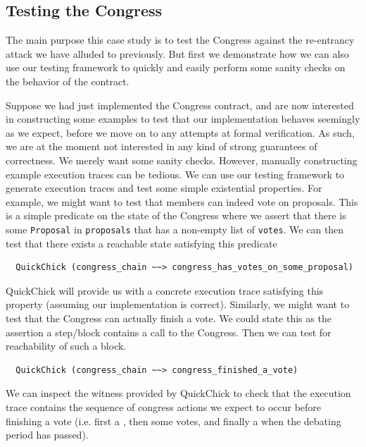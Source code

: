\documentclass[twoside,11pt,openright]{report}
\newenvironment{code}{\captionsetup{type=figure, singlelinecheck=off, justification=raggedleft}}{}
\newcommand{\coq}[1]{\texttt{#1}}
\begin{document}
\subsection{Testing the Congress}
The main purpose this case study is to test the Congress against the re-entrancy attack we have alluded to previously. But first we demonstrate how we can also use our testing framework to quickly and easily perform some sanity checks on the behavior of the contract.

Suppose we had just implemented the Congress contract, and are now interested in constructing some examples to test that our implementation behaves seemingly as we expect, before we move on to any attempts at formal verification. As such, we are at the moment not interested in any kind of strong guarantees of correctness. We merely want some sanity checks. However, manually constructing example execution traces can be tedious. We can use our testing framework to generate execution traces and test some simple existential properties. For example, we might want to test that members can indeed vote on proposals. This is a simple predicate on the state of the Congress where we assert that there is some \coq{Proposal} in \coq{proposals} that has a non-empty list of \coq{votes}. We can then test that there exists a reachable state satisfying this predicate
\begin{code}
\begin{verbatim}
  QuickChick (congress_chain ~~> congress_has_votes_on_some_proposal)
\end{verbatim}
\end{code}
QuickChick will provide us with a concrete execution trace satisfying this property (assuming our implementation is correct). Similarly, we might want to test that the Congress can actually finish a vote. We could state this as the assertion a step/block contains a \finishproposal{} call to the Congress. Then we can test for reachability of such a block.
\begin{code}
\begin{verbatim}
  QuickChick (congress_chain ~~> congress_finished_a_vote)
\end{verbatim}
\end{code}
We can inspect the witness provided by QuickChick to check that the execution trace contains the sequence of congress actions we expect to occur before finishing a vote (i.e. first a \createproposal{}, then some votes, and finally a \finishproposal{} when the debating period has passed).
\end{document}
